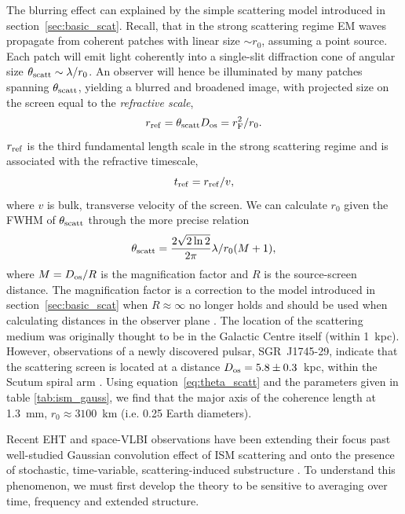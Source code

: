 The blurring effect can explained by the simple scattering model introduced in  section~\ref{sec:basic_scat}. Recall, that in the strong scattering regime EM waves propagate from coherent patches with linear size $\sim r_0$, assuming a point source. Each patch will emit light coherently into a single-slit diffraction cone of angular size $\theta_{\rm scatt} \sim \lambda /r_0$. An observer will hence be illuminated by many patches spanning $\theta_{\rm scatt}$, yielding a blurred and broadened image, with projected size on the screen equal to the \emph{refractive scale},
\begin{equation}
r_{\rm ref} = \theta_{\rm scatt} D_{\rm os} = r_{\rm F}^2/r_0.
\end{equation}
$r_{\rm ref}$ is the third fundamental length scale in the strong scattering regime and is associated with the refractive timescale,
\begin{equation}
t_{\rm ref} = r_{\rm ref}/v,
\end{equation}
where $v$ is bulk, transverse velocity of the screen.
We can calculate $r_0$ given the FWHM of $\theta_{\rm scatt}$ through the more precise relation
\begin{equation}\label{eq:theta_scatt}
 \theta_{\rm scatt} = \frac{2\sqrt{2\ln{2}}}{2\pi} \lambda / r_0 (M+1),
\end{equation} 
where $M = D_{\rm os}/R$ is the magnification factor and $R$ is the source-screen distance. The magnification factor is a correction to the model introduced in section~\ref{sec:basic_scat} when $R \approx \infty$ no longer holds and should be used when calculating distances in the observer plane \citep*{Goodman_1989}.
The location of the scattering medium was originally thought to be in the Galactic Centre itself (within 1~kpc). However, observations of a newly discovered pulsar, SGR~J1745-29, indicate that the scattering screen is located at a distance $D_{\rm os} = 5.8 \pm 0.3$~kpc, within the Scutum spiral arm \citep{Bower_2014}. Using equation~\ref{eq:theta_scatt} and the parameters given in table \ref{tab:ism_gauss}, we find that the major axis of the coherence length at 1.3~mm, $r_0 \approx 3100$~km (i.e. 0.25 Earth diameters).


Recent EHT and space-VLBI observations have been extending their focus past well-studied Gaussian convolution effect of ISM scattering and onto the presence of stochastic, time-variable, scattering-induced substructure \citep[e.g.][]{Fish_2016, Johnson_2016}. To understand this phenomenon, we must first develop the theory to be sensitive to averaging over time, frequency and extended structure. 

